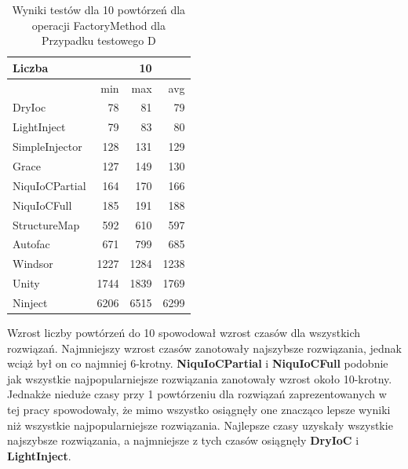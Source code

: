 \documentclass[12pt]{article}
\begin{document}
\begin{table}[H]
\captionsetup{belowskip=0pt,aboveskip=0pt}
\begin{center}
\begin{small}
	\begin{tabular}{ | l | r r r | }
    		\hline
Liczba & & 10 & \\ \hline
 & min & max & avg \\ \hline
DryIoc & 78 & 81 & 79 \\ \hline
LightInject & 79 & 83 & 80 \\ \hline
SimpleInjector & 128 & 131 & 129 \\ \hline
Grace & 127 & 149 & 130 \\ \hline
NiquIoCPartial & 164 & 170 & 166 \\ \hline
NiquIoCFull & 185 & 191 & 188 \\ \hline
StructureMap & 592 & 610 & 597 \\ \hline
Autofac & 671 & 799 & 685 \\ \hline
Windsor & 1227 & 1284 & 1238 \\ \hline
Unity & 1744 & 1839 & 1769 \\ \hline
Ninject & 6206 & 6515 & 6299 \\ \hline
  	\end{tabular}
\end{small}
\end{center}
\caption{Wyniki testów dla 10 powtórzeń dla operacji FactoryMethod dla Przypadku testowego D}
\label{TestCaseB_FactoryMethod10}
\end{table}
Wzrost liczby powtórzeń do 10 spowodował wzrost czasów dla wszystkich rozwiązań. Najmniejszy wzrost czasów zanotowały najszybsze rozwiązania, jednak wciąż był on co najmniej 6-krotny. \textbf{NiquIoCPartial} i \textbf{NiquIoCFull} podobnie jak wszystkie najpopularniejsze rozwiązania zanotowały wzrost około 10-krotny. Jednakże nieduże czasy przy 1 powtórzeniu dla rozwiązań zaprezentowanych w tej pracy spowodowały, że mimo wszystko osiągnęły one znacząco lepsze wyniki niż wszystkie najpopularniejsze rozwiązania. Najlepsze czasy uzyskały wszystkie najszybsze rozwiązania, a najmniejsze z tych czasów osiągnęły \textbf{DryIoC} i \textbf{LightInject}.



\clearpage
\end{document}
